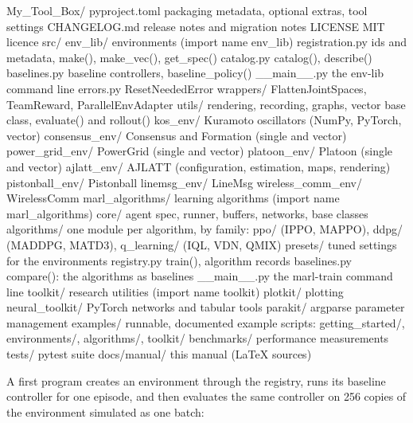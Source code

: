 \begin{textcode}
My_Tool_Box/
  pyproject.toml           packaging metadata, optional extras, tool settings
  CHANGELOG.md             release notes and migration notes
  LICENSE                  MIT licence
  src/
    env_lib/               environments (import name env_lib)
      registration.py      ids and metadata, make(), make_vec(), get_spec()
      catalog.py           catalog(), describe()
      baselines.py         baseline controllers, baseline_policy()
      __main__.py          the env-lib command line
      errors.py            ResetNeededError
      wrappers/            FlattenJointSpaces, TeamReward, ParallelEnvAdapter
      utils/               rendering, recording, graphs, vector base class,
                           evaluate() and rollout()
      kos_env/             Kuramoto oscillators (NumPy, PyTorch, vector)
      consensus_env/       Consensus and Formation (single and vector)
      power_grid_env/      PowerGrid (single and vector)
      platoon_env/         Platoon (single and vector)
      ajlatt_env/          AJLATT (configuration, estimation, maps, rendering)
      pistonball_env/      Pistonball
      linemsg_env/         LineMsg
      wireless_comm_env/   WirelessComm
    marl_algorithms/       learning algorithms (import name marl_algorithms)
      core/                agent spec, runner, buffers, networks, base classes
      algorithms/          one module per algorithm, by family: ppo/ (IPPO,
                           MAPPO), ddpg/ (MADDPG, MATD3), q_learning/ (IQL,
                           VDN, QMIX)
      presets/             tuned settings for the environments
      registry.py          train(), algorithm records
      baselines.py         compare(): the algorithms as baselines
      __main__.py          the marl-train command line
    toolkit/               research utilities (import name toolkit)
      plotkit/             plotting
      neural_toolkit/      PyTorch networks and tabular tools
      parakit/             argparse parameter management
  examples/                runnable, documented example scripts:
                           getting_started/, environments/, algorithms/,
                           toolkit/
  benchmarks/              performance measurements
  tests/                   pytest suite
  docs/manual/             this manual (LaTeX sources)
\end{textcode}

A first program creates an environment through the registry, runs its
baseline controller for one episode, and then evaluates the same controller on
256 copies of the environment simulated as one batch:

